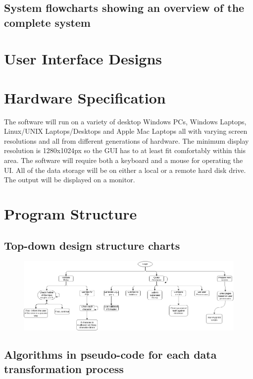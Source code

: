 \subsection{System flowcharts showing an overview of the complete system}

\section{User Interface Designs}
	

\section{Hardware Specification}
	The software will run on a variety of desktop Windows PCs, Windows Laptops,
	Linux/UNIX Laptops/Desktops and Apple Mac Laptops all with varying screen
	resolutions and all from different generations of hardware. The minimum
	display resolution is 1280x1024px so the GUI has to at least fit comfortably
	within this area. The software will require both a keyboard and a mouse for
	operating the UI. All of the data storage will be on either a local or a
	remote hard disk drive. The output will be displayed on a monitor.


\section{Program Structure}

\subsection{Top-down design structure charts}

\begin{figure}
	\includegraphics[width=\textwidth]{./Design/tdsl.png}
\end{figure}

\subsection{Algorithms in pseudo-code for each data transformation process}

